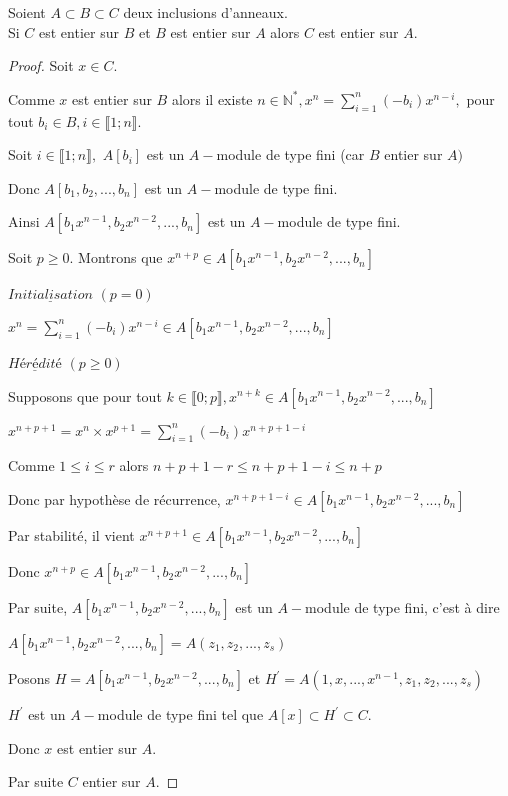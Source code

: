 \begin{moncorollaire}
	Soient $A \subset B \subset C $ deux inclusions d'anneaux.\\
	Si $C$ est entier sur $B$ et $B$ est entier sur $A$ alors $C$ est entier sur $A$.
\end{moncorollaire}
\begin{proof}
	Soit $x\in C.$
	
	Comme $x$ est entier sur $B$ alors il existe $n\in \mathbb{N}^{\ast },x^{n}=\sum\limits_{i=1}^{n}(-b_{i})x^{n-i},$ pour tout $b_{i}\in
	B,i\in \llbracket 1; n \rrbracket.$
	
	Soit $i\in \llbracket 1; n \rrbracket,$ $A[b_{i}]$ est un $A-$module de type fini
	(car $B$ entier sur $A)$
	
	Donc $A[b_{1},b_{2},...,b_{n}]$ est un $A-$module de type fini.
	
	Ainsi $A[b_{1}x^{n-1},b_{2}x^{n-2},...,b_{n}]$ est un $A-$module de type
	fini.
	
	Soit $p\geq 0.$ Montrons que $x^{n+p}\in
	A[b_{1}x^{n-1},b_{2}x^{n-2},...,b_{n}]$
	
	$\underline{Initialisation}$ $(p=0)$
	
	$x^{n}=\sum\limits_{i=1}^{n}(-b_{i})x^{n-i}\in
	A[b_{1}x^{n-1},b_{2}x^{n-2},...,b_{n}]$
	
	$\underline{Hérédité}$ $(p\geq 0)$
	
	Supposons que pour tout $k\in \llbracket 0; p \rrbracket,x^{n+k}\in
	A[b_{1}x^{n-1},b_{2}x^{n-2},...,b_{n}]$
	
	$x^{n+p+1}=x^{n}\times x^{p+1}=\sum\limits_{i=1}^{n}(-b_{i})x^{n+p+1-i}$
	
	Comme $1\leq i\leq r$ alors $n+p+1-r\leq n+p+1-i\leq n+p$
	
	Donc par hypothèse de récurrence, $x^{n+p+1-i}\in
	A[b_{1}x^{n-1},b_{2}x^{n-2},...,b_{n}]$
	
	Par stabilité, il vient $x^{n+p+1}\in
	A[b_{1}x^{n-1},b_{2}x^{n-2},...,b_{n}]$
	
	Donc $x^{n+p}\in A[b_{1}x^{n-1},b_{2}x^{n-2},...,b_{n}]$
	
	Par suite, $A[b_{1}x^{n-1},b_{2}x^{n-2},...,b_{n}]$ est un $A-$module de
	type fini, c'est à dire 
	
	$A[b_{1}x^{n-1},b_{2}x^{n-2},...,b_{n}]=A(z_{1},z_{2},...,z_{s})$
	
	Posons $H=A[b_{1}x^{n-1},b_{2}x^{n-2},...,b_{n}]$ et $H^{\prime
	}=A(1,x,...,x^{n-1},z_{1},z_{2},...,z_{s})$
	
	$H^{\prime }$ est un $A-$module de type fini tel que $A[x]\subset H^{\prime
	}\subset C.$
	
	Donc $x$ est entier sur $A.$
	
	Par suite $C$ entier sur $A.$
\end{proof}
